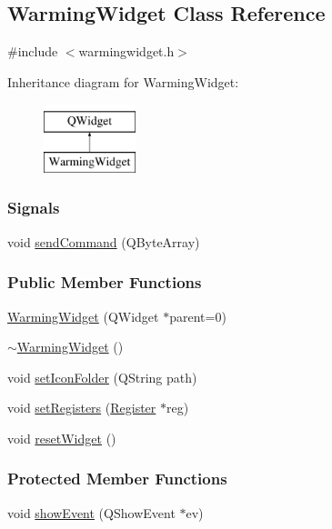\hypertarget{classWarmingWidget}{}\subsection{Warming\+Widget Class Reference}
\label{classWarmingWidget}


{\ttfamily \#include $<$warmingwidget.\+h$>$}

Inheritance diagram for Warming\+Widget\+:\begin{figure}[H]
\begin{center}
\leavevmode
\includegraphics[height=2.000000cm]{classWarmingWidget}
\end{center}
\end{figure}
\subsubsection*{Signals}
\begin{DoxyCompactItemize}
\item 
void \hyperlink{classWarmingWidget_ab18f4c153590131b6f391b084a4351f4}{send\+Command} (Q\+Byte\+Array)
\end{DoxyCompactItemize}
\subsubsection*{Public Member Functions}
\begin{DoxyCompactItemize}
\item 
\hyperlink{classWarmingWidget_a99e5c7ec6836696b8b0d35415a0604e7}{Warming\+Widget} (Q\+Widget $\ast$parent=0)
\item 
\hyperlink{classWarmingWidget_a17ad9285138404c3dae609b9c8c64912}{$\sim$\+Warming\+Widget} ()
\item 
void \hyperlink{classWarmingWidget_a217bbee950a217a90e0a426d35f02f1d}{set\+Icon\+Folder} (Q\+String path)
\item 
void \hyperlink{classWarmingWidget_a15ba48978ff7a7f38ea2a09009af3162}{set\+Registers} (\hyperlink{classRegister}{Register} $\ast$reg)
\item 
void \hyperlink{classWarmingWidget_a4aa925700a3d51f16d1c61dcd447d503}{reset\+Widget} ()
\end{DoxyCompactItemize}
\subsubsection*{Protected Member Functions}
\begin{DoxyCompactItemize}
\item 
void \hyperlink{classWarmingWidget_aca4d5901fb6fa056dbcd01a0f90a2164}{show\+Event} (Q\+Show\+Event $\ast$ev)
\end{DoxyCompactItemize}
